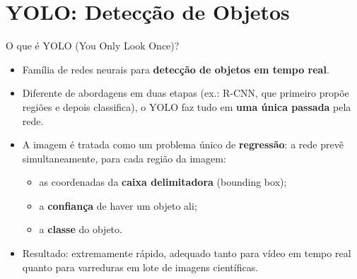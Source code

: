 \documentclass[aspectratio=169]{beamer}
\begin{document}
\section{YOLO: Detecção de Objetos}

\begin{frame}{O que é YOLO (You Only Look Once)?}
  \begin{itemize}
    \item Família de redes neurais para \textbf{detecção de objetos em tempo real}.
    \item Diferente de abordagens em duas etapas (ex.: R-CNN, que primeiro propõe regiões e depois classifica), o YOLO faz tudo em \textbf{uma única passada} pela rede.
    \item A imagem é tratada como um problema único de \textbf{regressão}: a rede prevê simultaneamente, para cada região da imagem:
    \begin{itemize}
      \item as coordenadas da \textbf{caixa delimitadora} (bounding box);
      \item a \textbf{confiança} de haver um objeto ali;
      \item a \textbf{classe} do objeto.
    \end{itemize}
    \item Resultado: extremamente rápido, adequado tanto para vídeo em tempo real quanto para varreduras em lote de imagens científicas.
  \end{itemize}
\end{frame}
\end{document}
